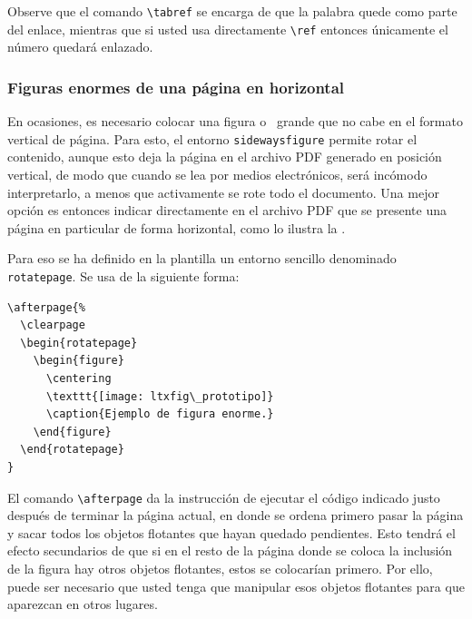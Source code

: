 Observe que el comando \verb+\tabref+ se encarga de que la palabra
\emph{\tabla} quede como parte del enlace, mientras que si usted usa
directamente \verb+\ref+ entonces únicamente el número quedará
enlazado.

\subsubsection{Figuras enormes de una página en horizontal}

En ocasiones, es necesario colocar una figura o \tabla\ grande que no
cabe en el formato vertical de página.  Para esto, el entorno
\verb+sidewaysfigure+ permite rotar el contenido, aunque esto deja la
página en el archivo PDF generado en posición vertical, de modo que
cuando se lea por medios electrónicos, será incómodo interpretarlo, a
menos que activamente se rote todo el documento.  Una mejor opción es
entonces indicar directamente en el archivo PDF que se presente una
página en particular de forma horizontal, como lo ilustra la
.
\clearpage %



Para eso se ha definido en la plantilla un entorno sencillo denominado
\verb+rotatepage+.  Se usa de la siguiente forma:
%
\begin{verbatim}
\afterpage{%
  \clearpage
  \begin{rotatepage}
    \begin{figure}
      \centering
      \texttt{[image: ltxfig\_prototipo]}
      \caption{Ejemplo de figura enorme.}
    \end{figure}
  \end{rotatepage}
}
\end{verbatim}
%
El comando \verb+\afterpage+ da la instrucción de ejecutar el código
indicado justo después de terminar la página actual, en donde se
ordena primero pasar la página y sacar todos los objetos flotantes que
hayan quedado pendientes.  Esto tendrá el efecto secundarios de que si
en el resto de la página donde se coloca la inclusión de la figura hay
otros objetos flotantes, estos se colocarían primero.
%
Por ello, puede ser necesario que usted tenga que manipular esos
objetos flotantes para que aparezcan en otros lugares.

